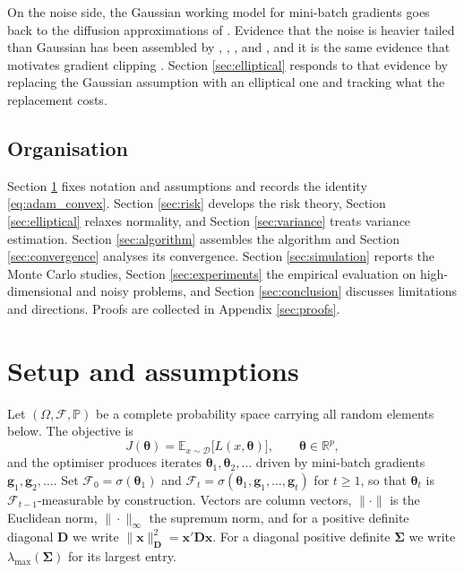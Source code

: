 \documentclass[a4paper,fleqn]{cas-sc}
\theoremstyle{plain}
\theoremstyle{definition}
\theoremstyle{remark}
\newcommand{\E}{\mathbb{E}}
\newcommand{\Real}{\mathbb{R}}
\begin{document}
On the noise side, the Gaussian working model for mini-batch gradients goes back to the diffusion approximations of \citet{mandt2017}. Evidence that the noise is heavier tailed than Gaussian has been assembled by \citet{simsekli2019}, \citet{panigrahi2019}, \citet{zhang2020attention}, and \citet{gurbuzbalaban2021}, and it is the same evidence that motivates gradient clipping \citep{zhang2020clipping}. Section \ref{sec:elliptical} responds to that evidence by replacing the Gaussian assumption with an elliptical one and tracking what the replacement costs.

\subsection{Organisation}

Section \ref{sec:setup} fixes notation and assumptions and records the identity \eqref{eq:adam_convex}. Section \ref{sec:risk} develops the risk theory, Section \ref{sec:elliptical} relaxes normality, and Section \ref{sec:variance} treats variance estimation. Section \ref{sec:algorithm} assembles the algorithm and Section \ref{sec:convergence} analyses its convergence. Section \ref{sec:simulation} reports the Monte Carlo studies, Section \ref{sec:experiments} the empirical evaluation on high-dimensional and noisy problems, and Section \ref{sec:conclusion} discusses limitations and directions. Proofs are collected in Appendix \ref{sec:proofs}.

\section{Setup and assumptions}
\label{sec:setup}

Let $(\Omega,\mathcal F,\mathbb P)$ be a complete probability space carrying all random elements below. The objective is
\begin{equation}
J(\bm\theta)=\E_{x\sim\mathcal D}\bigl[L(x,\bm\theta)\bigr],
\qquad
\bm\theta\in\Real^{p},
\end{equation}
and the optimiser produces iterates $\bm\theta_1,\bm\theta_2,\dots$ driven by mini-batch gradients $\bm g_1,\bm g_2,\dots$. Set $\mathcal F_0=\sigma(\bm\theta_1)$ and $\mathcal F_t=\sigma(\bm\theta_1,\bm g_1,\dots,\bm g_t)$ for $t\ge1$, so that $\bm\theta_t$ is $\mathcal F_{t-1}$-measurable by construction. Vectors are column vectors, $\|\cdot\|$ is the Euclidean norm, $\|\cdot\|_\infty$ the supremum norm, and for a positive definite diagonal $\bm D$ we write $\|\bm x\|^2_{\bm D}=\bm x'\bm D\bm x$. For a diagonal positive definite $\bm\Sigma$ we write $\lambda_{\max}(\bm\Sigma)$ for its largest entry.
\end{document}
